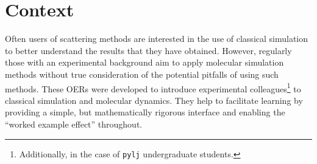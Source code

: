 \section*{Context}
Often users of scattering methods are interested in the use of classical simulation to better understand the results that they have obtained.
However, regularly those with an experimental background aim to apply molecular simulation methods without true consideration of the potential pitfalls of using such methods.
These OERs were developed to introduce experimental colleagues\footnote{Additionally, in the case of \texttt{pylj} undergraduate students.} to classical simulation and molecular dynamics.
They help to facilitate learning by providing a simple, but mathematically rigorous interface and enabling the ``worked example effect'' throughout.
